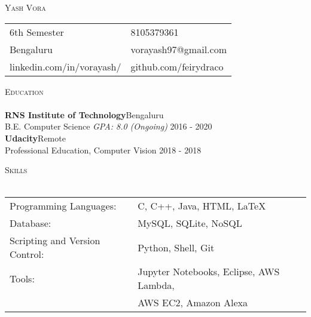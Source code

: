 \documentclass[12pt, a4paper]{article}
\newcommand{\lineunder} {
    \vspace*{-8pt} \\
    \hspace*{-18pt} \hrulefill \\
}
\newcommand{\header} [1] {
    {\hspace*{-18pt}\vspace*{6pt} \textsc{#1}}
    \vspace*{-6pt} \lineunder
}
\begin{document}
\vspace*{-40pt}

    

\vspace*{-10pt}
\begin{center}
	{\Huge \scshape {Yash Vora}}
\end{center}


\begin{tabularx}{\textwidth}{X l}
6th Semester & 8105379361  \\
Bengaluru & vorayash97@gmail.com \\
linkedin.com/in/vorayash/ & github.com/feirydraco \\ 
\end{tabularx}

\header{Education}
\textbf{RNS Institute of Technology}\hfill Bengaluru\\
B.E. Computer Science \textit{GPA: 8.0 (Ongoing)} \hfill 2016 - 2020\\
\vspace{2mm}
\textbf{Udacity}\hfill Remote\\
Professional Education, Computer Vision \hfill 2018 - 2018\\
\vspace{2mm}



\header{Skills}
\begin{tabular}{ l l }
	Programming Languages:         & C, C++, Java, HTML, \LaTeX                                \\
	Database:                      & MySQL, SQLite, NoSQL                                      \\
	Scripting and Version Control: & Python, Shell, Git                                        \\
	Tools:                         & Jupyter Notebooks, Eclipse, AWS Lambda, \\
 													 & AWS EC2, Amazon Alexa \\
\end{tabular}
\vspace{2mm}
\end{document}
